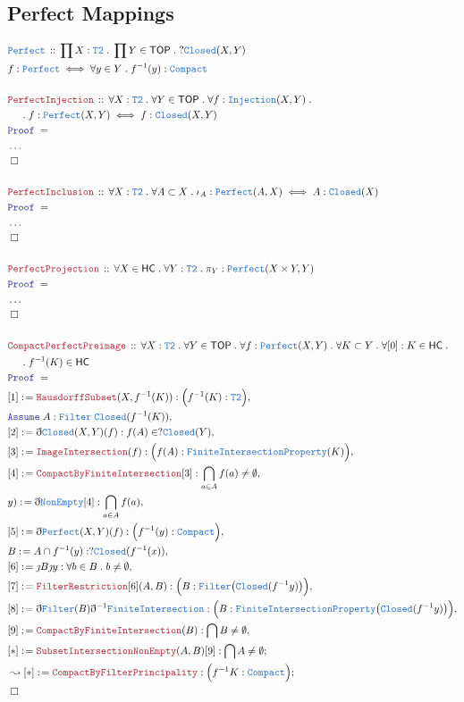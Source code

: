 \documentclass[12pt]{scrartcl}
\newcommand{\TYPE}[1]{\textcolor{NavyBlue}{\mathtt{#1}}}
\newcommand{\LOGIC}[1]{\textcolor{Blue}{\mathtt{#1}}}
\newcommand{\THM}[1]{\textcolor{Maroon}{\mathtt{#1}}}
\renewcommand{\.}{\; . \;}
\newcommand{\de}{: \kern 0.1pc =}
\newcommand{\Theorem}[2]{& \THM{#1} \, :: \, #2 \\ & \Proof = \\ }
\newcommand{\DeclareType}[2]{& \TYPE{#1} \, :: \, #2 \\}
\newcommand{\DefineType}[3]{& #1 : \TYPE{#2} \iff #3 \\}
\newcommand{\NewLine}{\\ & \kern 1pc}
\newcommand{\Page}[1]{ \begin{align*} #1 \end{align*}   }
\newcommand{ \bd }{ \ByDef }
\newcommand{\NoProof}{ & \ldots \\ \EndProof}
\newcommand{\Say}[3]{& #1 \de #2 : #3, \\}
\newcommand{\Conclude}[3]{& #1 \de #2 : #3; \\}
\newcommand{\DeriveConclude}[3]{& \leadsto #1 \de #2 : #3 ; \\}
\newcommand{\Assume}[2]{& \LOGIC{Assume} \; #1 : #2, \\}
\newcommand{\QED}{\; \square}
\newcommand{\EndProof}{& \QED \\}
\newcommand{\ByDef}{\eth}
\newcommand{\ByConstr}{\jmath}
\newcommand{\Proof}{\LOGIC{Proof} \; }
\newcommand{\TOP}{\mathsf{TOP}}
\newcommand{\HC}{\mathsf{HC}}
\begin{document}
\subsection{Perfect Mappings}
\Page{
	\DeclareType{Perfect}{\prod X : \TYPE{T2} \. \prod Y \in \TOP \. ?\TYPE{Closed}(X,Y) }
	\DefineType{f}{Perfect}{\forall y \in Y \. f^{-1}(y) : \TYPE{Compact}}
	\\
	\Theorem{PerfectInjection}
	{
		\forall X : \TYPE{T2} \. 
		\forall Y \in \TOP \.
		\forall f :  \TYPE{Injection}(X,Y) \. \NewLine \.
		f :\TYPE{Perfect}(X,Y) \iff f : \TYPE{Closed}(X,Y)				 
	}
	\NoProof
	\\
	\Theorem{PerfectInclusion}
	{
		\forall X : \TYPE{T2} \. 
		\forall A \subset  X \.
		\iota_{A} :\TYPE{Perfect}(A,X) \iff  A : \TYPE{Closed}(X)				 
	}
	\NoProof
	\\
	\Theorem{PerfectProjection}
	{
		\forall X \in \HC \.
		\forall Y : \TYPE{T2} \. 
		\pi_Y : \TYPE{Perfect}(X \times Y, Y )
	}
	\NoProof
	\\
	\Theorem{ CompactPerfectPreimage }
	{
		\forall X : \TYPE{T2} \.
		\forall Y \in \TOP \.
		\forall f  : \TYPE{Perfect}(X,Y) \.
		\forall K \subset Y \.
		\forall [0] : K \in \HC \.
		\NewLine \.
		f^{-1}(K) \in \HC
	}
	\Say{[1]}{\THM{HausdorffSubset}(X,f^{-1}(K))}{\Big(  f^{-1}(K) : \TYPE{T2} \Big)}
	\Assume{A}{\TYPE{Filter}\;\TYPE{Closed}(f^{-1}(K))}
	\Say{[2]}{\bd \TYPE{Closed}(X,Y)(f)}{f(A) \in ?\TYPE{Closed}(Y)}
	\Say{[3]}{\THM{ImageIntersection}(f)}{\Big( f(A) : \TYPE{FiniteIntersectionProperty}(K)  \Big)}
	\Say{[4]}{\THM{CompactByFiniteIntersection}[3]}{\bigcap_{a \in A} f(a) \neq \emptyset}
	\Say{y)}{\bd\TYPE{NonEmpty}[4]}{\bigcap_{a \in A} f(a)}
	\Say{[5]}{\bd \TYPE{Perfect}(X,Y)(f)}{ \Big( f^{-1}(y) : \TYPE{Compact}\Big) }
	\Say{B}{ A \cap f^{-1}(y)}{?\TYPE{Closed}(f^{-1}(x))}
	\Say{[6]}{\ByConstr B\ByConstr y}{\forall b \in B \. b \neq \emptyset}
	\Say{[7]}{\THM{FilterRestriction}[6](A,B)}{\Big(B : \TYPE{Filter}\big(\TYPE{Closed}(f^{-1}y)\big)\Big) }
	\Say{[8]}{\bd \TYPE{Filter}(B)\bd^{-1}\TYPE{FiniteIntersection}}{\Big(B : \TYPE{FiniteIntersectionProperty}\big(\TYPE{Closed}(f^{-1}y)\big)\Big)}
	\Say{[9]}{\THM{CompactByFiniteIntersection}(B)}{ \bigcap B \neq \emptyset   }
	\Conclude{[*]}{\THM{SubsetIntersectionNonEmpty}(A,B)[9]}{\bigcap A \neq \emptyset}
	\DeriveConclude{[*]}{\THM{CompactByFilterPrincipality}}{\Big( f^{-1}K : \TYPE{Compact}\Big)}
	\EndProof
}
\end{document}
